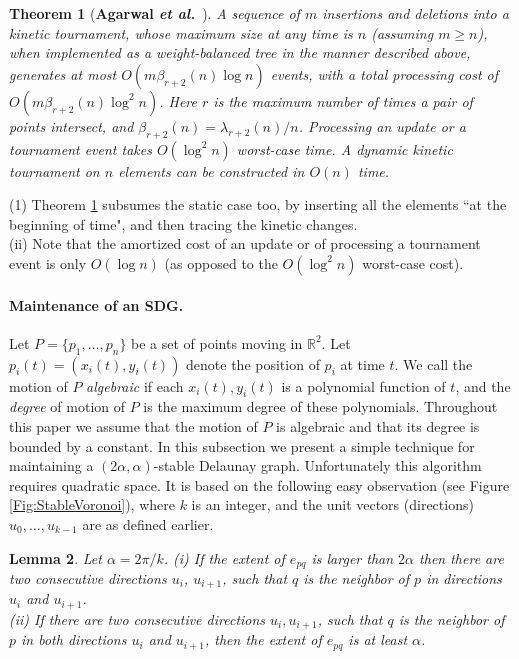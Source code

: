 \documentclass[letter,11pt]{article}
\newtheorem{theorem}{Theorem}[section]
\newtheorem{lemma}[theorem]{Lemma}
\def \reals{{\mathbb R}}
\begin{document}
\begin{theorem}[\textbf{Agarwal \textit{et al.}}~\cite{KineticNeighbors}] \label{thm:kinetic-tour}
A sequence of $m$ insertions and deletions into a kinetic tournament,
whose maximum size at any time is $n$ (assuming $m\ge n$), when
implemented as a weight-balanced tree in the manner described above,
generates at most $O(m\beta_{r+2}(n)\log n)$ events, with a total processing cost
of $O(m\beta_{r+2}(n)\log^2 n)$. Here $r$ is the maximum number of times a pair of points intersect, and $\beta_{r+2}(n)=\lambda_{r+2}(n)/n$.
Processing an update or a tournament event takes
$O(\log ^2 n)$ worst-case time. A dynamic kinetic tournament on $n$
elements can be constructed in $O(n)$ time.
\end{theorem}

 (1) Theorem \ref{thm:kinetic-tour} subsumes the static case too, by inserting all the elements ``at the beginning of time", and then tracing the kinetic changes. \\
\noindent (ii) Note that the amortized cost of an update or of processing a tournament event is only $O(\log n)$ (as opposed to the $O(\log^2n)$ worst-case cost).

\paragraph{Maintenance of an SDG.}
Let $P=\{p_1,\ldots,p_n\}$ be a set of points 
moving in $\reals^2$. Let $p_i(t)=(x_i(t),y_i(t))$ denote the position
of $p_i$ at time $t$. We call the motion of $P$
\emph{algebraic} if each $x_i(t),y_i(t)$ is a
polynomial function of $t$, and the \emph{degree} of motion of $P$ is the maximum
degree of these polynomials.
Throughout this paper we assume that the motion of $P$ is
algebraic and that its degree is bounded by a constant.
In this subsection we present a simple technique for maintaining a
$(2\alpha,\alpha)$-stable Delaunay graph. Unfortunately this
algorithm requires quadratic space.
It is based on the following easy observation (see Figure \ref{Fig:StableVoronoi}),
where $k$ is an integer, and the unit vectors (directions) $u_0,\ldots,u_{k-1}$ are as defined earlier.

\begin{lemma} \label{lem:alpha}
Let $\alpha = 2\pi/k$.
(i) If the extent of $e_{pq}$ is larger than $2\alpha$ then there are two consecutive directions 
$u_i$, $u_{i+1}$, such that $q$ is the neighbor of $p$ in directions $u_i$ and $u_{i+1}$. \\
(ii) If there are two consecutive directions $u_i,u_{i+1}$, such that $q$ is the neighbor of $p$ in both directions $u_i$ and $u_{i+1}$, then
the extent of $e_{pq}$ is at least $\alpha$.
\end{lemma}
\end{document}

